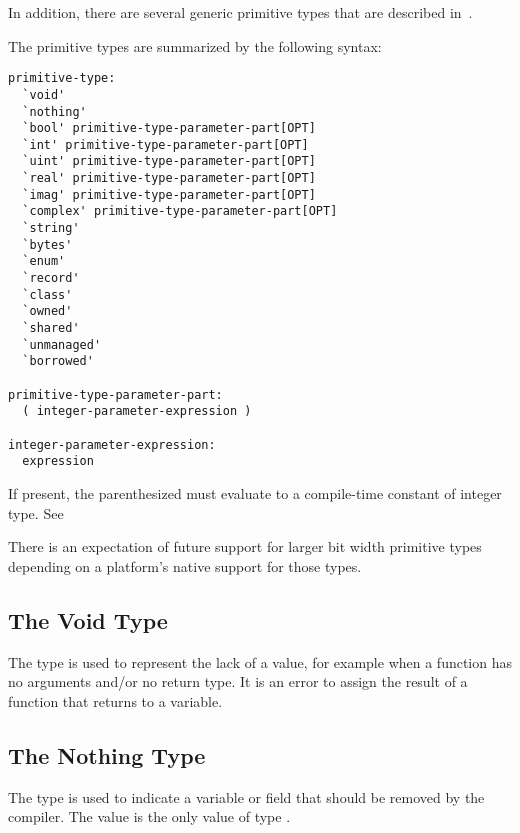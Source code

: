 In addition, there are several generic primitive types that are described
in~.

The primitive types are summarized by the following syntax:
\begin{syntax}
\begin{verbatim}
primitive-type:
  `void'
  `nothing'
  `bool' primitive-type-parameter-part[OPT]
  `int' primitive-type-parameter-part[OPT]
  `uint' primitive-type-parameter-part[OPT]
  `real' primitive-type-parameter-part[OPT]
  `imag' primitive-type-parameter-part[OPT]
  `complex' primitive-type-parameter-part[OPT]
  `string'
  `bytes'
  `enum'
  `record'
  `class'
  `owned'
  `shared'
  `unmanaged'
  `borrowed'

primitive-type-parameter-part:
  ( integer-parameter-expression )

integer-parameter-expression:
  expression
\end{verbatim}
\end{syntax}

If present, the parenthesized  must
evaluate to a compile-time constant of integer type.  See~

\begin{openissue}
There is an expectation of future support for larger bit width
primitive types depending on a platform's native support for those
types.
\end{openissue}

\subsection{The Void Type}
\label{The_Void_Type}

The  type is used to represent the lack of a value, for
example when a function has no arguments and/or no return type.
It is an error to assign the result of a function that returns
 to a variable.

\subsection{The Nothing Type}
\label{The_Nothing_type}

The  type is used to indicate a variable or field that
should be removed by the compiler. The value  is the only
value of type .

